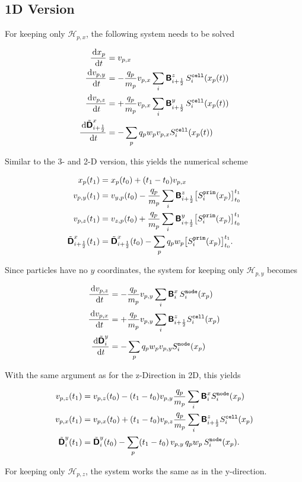 \documentclass[11pt]{article}
\newcommand{\cell}{\texttt{cell}}
\newcommand{\node}{\texttt{node}}
\newcommand{\prim}{\texttt{prim}}
\begin{document}
\subsection{1D Version}
For keeping only $\mathcal{H}_{p,x}$, the following system needs to be solved

$$
\begin{aligned}
    \fract{x_p}{t} &= v_{p,x} \\
    \fract{v_{p,y}}{t} &= -\frac{q_p}{m_p} v_{p,x} \sum_{i} \arrB^{z}_{\iph} \,S^\cell_i(x_p(t))\\
    \fract{v_{p,z}}{t} &= +\frac{q_p}{m_p} v_{p,x} \sum_{i} \arrB^{y}_{\iph} \,S^\cell_i(x_p(t))\\
    \fract{\tilde{\arrD}^{x}_{\iph}}{t} &= - \sum_p q_p w_p v_{p,x} S^\cell_i(x_p(t)) 
\end{aligned}
$$

Similar to the 3- and 2-D version, this yields the numerical scheme

$$
\begin{aligned}
    x_p&(t_1) = x_p(t_0) + (t_1-t_0) v_{p,x} \\
    v_{p, y}&(t_1) = v_{y,p}(t_0) -  
    \frac{q_p}{m_p} \sum_{i} \arrB^{z}_{\iph} \big[S^\prim_i(x_p)\big]_{t_0}^{t_1}    
    \\
    v_{p, z}&(t_1) =  v_{z,p}(t_0) + 
    \frac{q_p}{m_p} \sum_{i} \arrB^{y}_{\iph} \big[S^\prim_i(x_p)\big]_{t_0}^{t_1}  
    \\
    \tilde{\arrD}^{x}_{\iph} & (t_1) =  \tilde{\arrD}^{x}_{\iph}(t_0) - 
    \sum_p q_p w_p \big[S^\prim_i(x_p)\big]_{t_0}^{t_1} .
\end{aligned}
$$

Since particles have no $y$ coordinates, the system for keeping only $\mathcal{H}_{p,y}$ becomes

$$
\begin{aligned}
    \fract{v_{p,z}}{t} &= -\frac{q_p}{m_p} v_{p,y} \sum_{i} \arrB^{x}_{i} \,S^\node_i(x_p)\\
    \fract{v_{p,x}}{t} &= +\frac{q_p}{m_p} v_{p,y} \sum_{i} \arrB^{z}_{\iph} S^\cell_i(x_p)\\
    \fract{\tilde{\arrD}^{y}_{i}}{t} &= - \sum_p q_p w_p v_{p,y} S^\node_i(x_p)  
\end{aligned}
$$

With the same argument as for the z-Direction in 2D, this yields

$$
\begin{aligned}
    v_{p,z}&(t_1) = v_{p,z}(t_0) -  
    (t_1 - t_0) v_{p,y} \frac{q_p}{m_p} \sum_{i} \arrB^{x}_{i} S^\node_i(x_p)     
    \\
    v_{p,x}&(t_1) =  v_{p,x}(t_0) + 
    (t_1 - t_0) v_{p,z} \frac{q_p}{m_p} \sum_{i} \arrB^{z}_{\iph} S^\cell_i(x_p)   
    \\
    \tilde{\arrD}^{y}_{i} & (t_1) =  \tilde{\arrD}^{y}_{i}(t_0) - 
    \sum_p (t_1 - t_0) \, v_{p,y} \,q_p w_p \,S^\node_i(x_p).
\end{aligned}
$$

For keeping only $\mathcal{H}_{p,z}$, the system works the same as in the y-direction.
\end{document}
